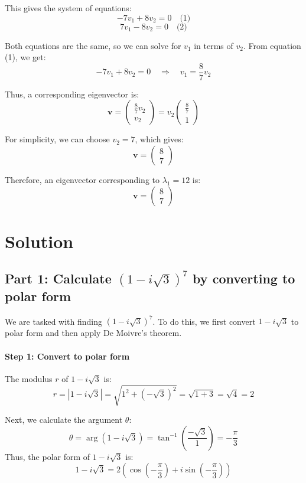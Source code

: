 \documentclass[11pt]{article}
\begin{document}
This gives the system of equations:
\[
-7v_1 + 8v_2 = 0 \quad \text{(1)}
\]
\[
7v_1 - 8v_2 = 0 \quad \text{(2)}
\]

Both equations are the same, so we can solve for \( v_1 \) in terms of \( v_2 \). From equation (1), we get:
\[
-7v_1 + 8v_2 = 0 \quad \Rightarrow \quad v_1 = \frac{8}{7}v_2
\]

Thus, a corresponding eigenvector is:
\[
\mathbf{v} = \begin{pmatrix} \frac{8}{7}v_2 \\ v_2 \end{pmatrix} = v_2 \begin{pmatrix} \frac{8}{7} \\ 1 \end{pmatrix}
\]

For simplicity, we can choose \( v_2 = 7 \), which gives:
\[
\mathbf{v} = \begin{pmatrix} 8 \\ 7 \end{pmatrix}
\]

Therefore, an eigenvector corresponding to \( \lambda_1 = 12 \) is:
\[
\mathbf{v} = \begin{pmatrix} 8 \\ 7 \end{pmatrix}
\]




\newpage

\section{Solution}

\subsection{Part 1: Calculate \( (1 - i\sqrt{3})^7 \) by converting to polar form}

We are tasked with finding \( (1 - i\sqrt{3})^7 \). To do this, we first convert \( 1 - i\sqrt{3} \) to polar form and then apply De Moivre's theorem.

\paragraph{Step 1: Convert to polar form}

The modulus \( r \) of \( 1 - i\sqrt{3} \) is:
\[
r = |1 - i\sqrt{3}| = \sqrt{1^2 + (-\sqrt{3})^2} = \sqrt{1 + 3} = \sqrt{4} = 2
\]

Next, we calculate the argument \( \theta \):
\[
\theta = \arg(1 - i\sqrt{3}) = \tan^{-1}\left( \frac{-\sqrt{3}}{1} \right) = -\frac{\pi}{3}
\]
Thus, the polar form of \( 1 - i\sqrt{3} \) is:
\[
1 - i\sqrt{3} = 2 \left( \cos\left( -\frac{\pi}{3} \right) + i \sin\left( -\frac{\pi}{3} \right) \right)
\]
\end{document}
